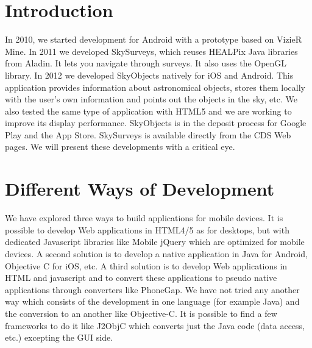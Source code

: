 \section{Introduction}
In 2010, we started development for Android with a prototype based on VizieR Mine. In 2011 we developed SkySurveys, which reuses HEALPix Java libraries from Aladin. It lets you navigate through surveys. It also uses the OpenGL library. In 2012 we developed SkyObjects natively for iOS and Android. This application provides information about astronomical objects, stores them locally with the user's own information and points out the objects in the sky, etc. We also tested the same type of application with HTML5 and we are working to improve its display performance. SkyObjects is in the deposit process for Google Play and the App Store. SkySurveys is available directly from the CDS Web pages. We will present these developments with a critical eye. 

\section{Different Ways of Development}

We have explored three ways to build applications for mobile devices.
It is possible to develop Web applications in HTML4/5 as for desktops, but with dedicated Javascript libraries like Mobile jQuery which are optimized for mobile devices. A second solution is to develop a native application in Java for Android, Objective C for iOS, etc. 
A third solution is to develop Web applications in HTML and javascript and to convert these applications to pseudo native applications through converters like PhoneGap. We have not tried any another way which consists of the development in one language (for example Java) and the conversion to an another like Objective-C. It is possible to find a few frameworks to do it like J2ObjC which converts just the Java code (data access, etc.) excepting the GUI side.

